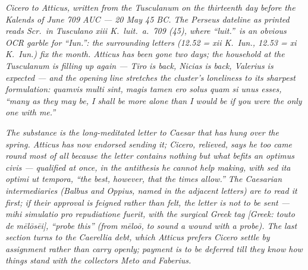 
\textit{Cicero to Atticus, written from the Tusculanum
on the thirteenth day before the Kalends of June 709
AUC --- 20 May 45 BC. The Perseus dateline as printed
reads \textit{Scr.\ in Tusculano xiii K.\ luit.\ a.\
709 (45)}, where ``luit.''\ is an obvious OCR garble
for ``Iun.'': the surrounding letters (12.52 = xii K.\
Iun., 12.53 = xi K.\ Iun.) fix the month. Atticus has
been gone two days; the household at the Tusculanum
is filling up again --- Tiro is back, Nicias is back,
Valerius is expected --- and the opening line stretches
the cluster's loneliness to its sharpest formulation:
\textit{quamvis multi sint, magis tamen ero solus
quam si unus esses}, ``many as they may be, I shall
be more alone than I would be if you were the only
one with me.''}

\textit{The substance is the long-meditated letter to
Caesar that has hung over the spring. Atticus has now
endorsed sending it; Cicero, relieved, says he too
came round most of all because the letter contains
nothing but what befits an \textit{optimus civis} ---
qualified at once, in the antithesis he cannot help
making, with \textit{sed ita optimi ut tempora}, ``the
best, however, that the times allow.'' The Caesarian
intermediaries (Balbus and Oppius, named in the
adjacent letters) are to read it first; if their
approval is feigned rather than felt, the letter is
not to be sent --- \textit{mihi simulatio pro
repudiatione fuerit}, with the surgical Greek tag
\textit{[Greek: touto de m\=el\=os\=ei]}, ``probe
this'' (from \textit{m\=elo\=o}, to sound a wound with
a probe). The last section turns to the Caerellia
debt, which Atticus prefers Cicero settle by
assignment rather than carry openly; payment is to be
deferred till they know how things stand with the
collectors Meto and Faberius.}
